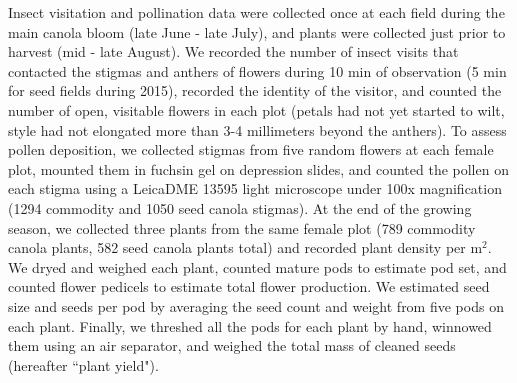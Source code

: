 \documentclass[12pt]{article} %
\begin{document}
Insect visitation and pollination data were collected once at each field during the main canola bloom (late June - late July), and plants were collected just prior to harvest (mid - late August).
We recorded the number of insect visits that contacted the stigmas and anthers of flowers during 10 min of observation (5 min for seed fields during 2015), recorded the identity of the visitor, and counted the number of open, visitable flowers in each plot (petals had not yet started to wilt, style had not elongated more than 3-4 millimeters beyond the anthers).
To assess pollen deposition, we collected stigmas from five random flowers at each female plot, mounted them in fuchsin gel \citep{beattie1971} on depression slides, and counted the pollen on each stigma using a Leica\texttrademark DME 13595 light microscope under 100x magnification (1294 commodity and 1050 seed canola stigmas).
At the end of the growing season, we collected three plants from the same female plot (789 commodity canola plants, 582 seed canola plants total) and recorded plant density per m$^2$.
We dryed and weighed each plant, counted mature pods to estimate pod set, and counted flower pedicels to estimate total flower production. %
We estimated seed size and seeds per pod by averaging the seed count and weight from five pods on each plant.
Finally, we threshed all the pods for each plant by hand, winnowed them using an air separator, and weighed the total mass of cleaned seeds (hereafter ``plant yield"). %
\end{document}
